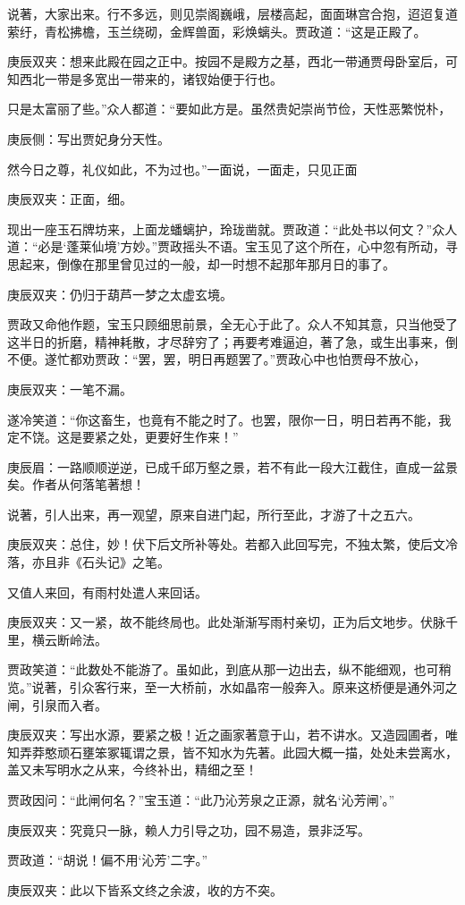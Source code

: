 \begin{parag}
    说著，大家出来。行不多远，则见崇阁巍峨，层楼高起，面面琳宫合抱，迢迢复道萦纡，青松拂檐，玉兰绕砌，金辉兽面，彩焕螭头。贾政道：“这是正殿了。\begin{note}庚辰双夹：想来此殿在园之正中。按园不是殿方之基，西北一带通贾母卧室后，可知西北一带是多宽出一带来的，诸钗始便于行也。\end{note}只是太富丽了些。”众人都道：“要如此方是。虽然贵妃崇尚节俭，天性恶繁悦朴，\begin{note}庚辰侧：写出贾妃身分天性。\end{note}然今日之尊，礼仪如此，不为过也。”一面说，一面走，只见正面\begin{note}庚辰双夹：正面，细。\end{note}现出一座玉石牌坊来，上面龙蟠螭护，玲珑凿就。贾政道：“此处书以何文？”众人道：“必是‘蓬莱仙境’方妙。”贾政摇头不语。宝玉见了这个所在，心中忽有所动，寻思起来，倒像在那里曾见过的一般，却一时想不起那年那月日的事了。\begin{note}庚辰双夹：仍归于葫芦一梦之太虚玄境。\end{note}贾政又命他作题，宝玉只顾细思前景，全无心于此了。众人不知其意，只当他受了这半日的折磨，精神耗散，才尽辞穷了；再要考难逼迫，著了急，或生出事来，倒不便。遂忙都劝贾政：“罢，罢，明日再题罢了。”贾政心中也怕贾母不放心，\begin{note}庚辰双夹：一笔不漏。\end{note}遂冷笑道：“你这畜生，也竟有不能之时了。也罢，限你一日，明日若再不能，我定不饶。这是要紧之处，更要好生作来！”\begin{note}庚辰眉：一路顺顺逆逆，已成千邱万壑之景，若不有此一段大江截住，直成一盆景矣。作者从何落笔著想！\end{note}
\end{parag}


\begin{parag}
    说著，引人出来，再一观望，原来自进门起，所行至此，才游了十之五六。\begin{note}庚辰双夹：总住，妙！伏下后文所补等处。若都入此回写完，不独太繁，使后文冷落，亦且非《石头记》之笔。\end{note}又值人来回，有雨村处遣人来回话。\begin{note}庚辰双夹：又一紧，故不能终局也。此处渐渐写雨村亲切，正为后文地步。伏脉千里，横云断岭法。\end{note}贾政笑道：“此数处不能游了。虽如此，到底从那一边出去，纵不能细观，也可稍览。”说著，引众客行来，至一大桥前，水如晶帘一般奔入。原来这桥便是通外河之闸，引泉而入者。\begin{note}庚辰双夹：写出水源，要紧之极！近之画家著意于山，若不讲水。又造园圃者，唯知弄莽憨顽石壅笨冢辄谓之景，皆不知水为先著。此园大概一描，处处未尝离水，盖又未写明水之从来，今终补出，精细之至！\end{note}贾政因问：“此闸何名？”宝玉道：“此乃沁芳泉之正源，就名‘沁芳闸’。”\begin{note}庚辰双夹：究竟只一脉，赖人力引导之功，园不易造，景非泛写。\end{note}贾政道：“胡说！偏不用‘沁芳’二字。”\begin{note}庚辰双夹：此以下皆系文终之余波，收的方不突。\end{note}
\end{parag}


